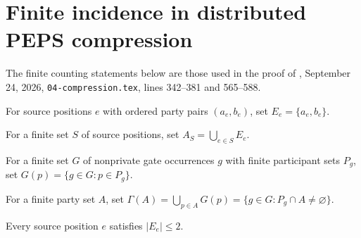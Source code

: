 \section{Finite incidence in distributed PEPS compression}
\label{sec:peps_compression_incidence}
The finite counting statements below are those used in the proof of
\cite[Theorem~5.2]{OpenAI2026PolynomialPEPS}, September 24, 2026,
\texttt{04-compression.tex}, lines 342--381 and 565--588.

\begin{definition}
    \label{def:compression_source_endpoints}
    \leanok
    For source positions $e$ with ordered party pairs $(a_e,b_e)$, set $E_e=\{a_e,b_e\}$.
\end{definition}

\begin{definition}
    \label{def:compression_corrected_parties}
    \leanok
    For a finite set $S$ of source positions, set $A_S=\bigcup_{e\in S}E_e$.
\end{definition}

\begin{definition}
    \label{def:compression_lifetime_gates}
    \leanok
    For a finite set $G$ of nonprivate gate occurrences $g$ with finite participant sets $P_g$, set $G(p)=\{g\in G:p\in P_g\}$.
\end{definition}

\begin{definition}
    \label{def:compression_touching_gates}
    \leanok
    For a finite party set $A$, set $\Gamma(A)=\bigcup_{p\in A}G(p)=\{g\in G:P_g\cap A\ne\varnothing\}$.
\end{definition}

\begin{lemma}
    \label{thm:compression_endpoint_count}
    \leanok
    Every source position $e$ satisfies $|E_e|\le2$.
\end{lemma}

